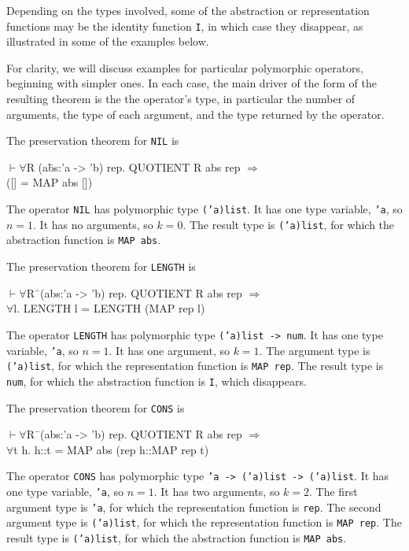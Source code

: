 \documentclass[envcountsame,runningheads]{llncs}
\begin{document}
Depending on the types involved, some
of the abstraction or representation functions
may be the identity function {\tt I}, in which case they disappear,
as illustrated in some of the examples below.

For clarity, we will discuss examples for particular polymorphic operators,
beginning with simpler ones.
In each case, the main driver of the form of the resulting theorem is the
the operator's type, in particular the number of arguments, the type of
each argument, and the type returned by the operator.

The preservation theorem for {\tt NIL} is
{\tt \begin{tabbing}
\hspace{5.5mm}
    $\vdash \forall$R (a\=bs:'a -> 'b) rep. QUOTIENT R abs rep $\Rightarrow$ \\
\>          ([] = MAP abs [])
\end{tabbing}}
The operator {\tt NIL} has polymorphic type {\tt ('a)list}.
It has one type variable, {\tt 'a}, so $n = 1$.
It has no arguments, so $k = 0$.
The result type is
{\tt ('a)list},
for which
the abstraction function
is {\tt MAP abs}.

\pagebreak[2]
The preservation theorem for {\tt LENGTH} is
{\tt \begin{tabbing}
\hspace{5.5mm}
    $\vdash \forall$R\=\ (abs:'a -> 'b) rep. QUOTIENT R abs rep $\Rightarrow$ \\
\>       $\forall$l. LENGTH l = LENGTH (MAP rep l)
\end{tabbing}}
The operator {\tt LENGTH} has polymorphic type {\tt ('a)list -> num}.
It has one type variable, {\tt 'a}, so $n = 1$.
It has one argument, so $k = 1$.
The argument type is
{\tt ('a)list},
for which
the representation function
is {\tt MAP rep}.
The result type is
{\tt num},
for which
the abstraction function
is {\tt I}, which disappears.

\pagebreak[2]
The preservation theorem for {\tt CONS} is
{\tt \begin{tabbing}
\hspace{5.5mm}
    $\vdash \forall$R\=\ (abs:'a -> 'b) rep. QUOTIENT R abs rep $\Rightarrow$ \\
\>       $\forall$t h. h::t = MAP abs (rep h::MAP rep t)
\end{tabbing}}
The operator {\tt CONS} has polymorphic type {\tt 'a -> ('a)list -> ('a)list}.
It has one type variable, {\tt 'a}, so $n = 1$.
It has two arguments, so $k = 2$.
The first argument type is
{\tt 'a},
for which
the representation function
is {\tt rep}.
The second argument type is
{\tt ('a)list},
for which
the representation function
is {\tt MAP rep}.
The result type is
{\tt ('a)list},
for which
the abstraction function
is {\tt MAP abs}.
\end{document}
